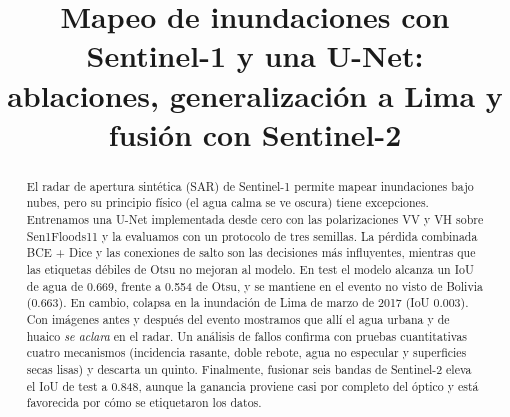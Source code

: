 \documentclass[conference]{IEEEtran}
\begin{document}
\title{Mapeo de inundaciones con Sentinel-1 y una U-Net:\\
ablaciones, generalización a Lima y fusión con Sentinel-2}

\author{%
}

\maketitle

\begin{abstract}
El radar de apertura sintética (SAR) de Sentinel-1 permite mapear inundaciones bajo nubes,
pero su principio físico (el agua calma se ve oscura) tiene excepciones. Entrenamos una U-Net
implementada desde cero con las polarizaciones VV y VH sobre Sen1Floods11 y la evaluamos con un
protocolo de tres semillas. La pérdida combinada BCE + Dice y las conexiones de salto son las
decisiones más influyentes, mientras que las etiquetas débiles de Otsu no mejoran al modelo. En
test el modelo alcanza un IoU de agua de 0.669, frente a 0.554 de Otsu, y se mantiene en el
evento no visto de Bolivia (0.663). En cambio, colapsa en la inundación de Lima de marzo de 2017
(IoU 0.003). Con imágenes antes y después del evento mostramos que allí el agua urbana y de
huaico \emph{se aclara} en el radar. Un análisis de fallos confirma con pruebas cuantitativas
cuatro mecanismos (incidencia rasante, doble rebote, agua no especular y superficies secas
lisas) y descarta un quinto. Finalmente, fusionar seis bandas de Sentinel-2 eleva el IoU de test
a 0.848, aunque la ganancia proviene casi por completo del óptico y está favorecida por cómo se
etiquetaron los datos.
\end{abstract}
\end{document}
